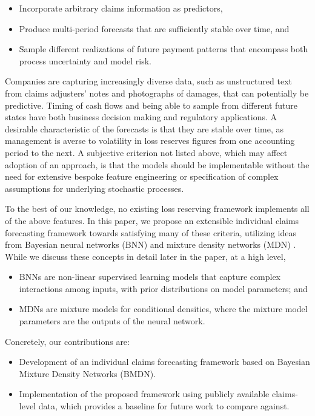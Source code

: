 \documentclass{article}
\begin{document}
\begin{itemize}
	\item Incorporate arbitrary claims information as predictors,
	\item Produce multi-period forecasts that are sufficiently stable over time, 
	and
	\item Sample different realizations of future payment patterns that encompass 
	both process uncertainty and model risk.
\end{itemize}
Companies are capturing increasingly diverse data, such as unstructured text 
from claims adjusters' notes and photographs of damages, that can potentially 
be predictive. Timing of cash flows and being able to sample from different 
future states have both business decision making and regulatory applications. A 
desirable characteristic of the forecasts is that they are stable over time, as 
management is averse to volatility in loss reserves figures from one accounting 
period to the next. A subjective criterion not listed above, which may affect
adoption of an approach, is that the models should be implementable without the
need for extensive bespoke feature engineering or specification of complex 
assumptions for underlying stochastic processes.

To the best of our knowledge, no existing loss reserving framework implements 
all of the above features. In this paper, we propose an extensible individual 
claims forecasting framework towards satisfying many of these criteria, utilizing
ideas from Bayesian neural networks (BNN) \cite{nealBayesianLearning2012} and 
mixture density networks (MDN) \cite{bishopMixtureDensity1994}. While we discuss
these concepts in detail later in the paper, at a high level,

\begin{itemize}
  \item BNNs are non-linear supervised learning models that capture complex 
  interactions among inputs, with prior distributions on model parameters; and
  \item MDNs are mixture models for conditional densities, where the mixture
  model parameters are the outputs of the neural network.
\end{itemize}
Concretely, our contributions are:

\begin{itemize}
	\item Development of an individual claims forecasting framework based on 
	Bayesian Mixture Density Networks (BMDN).
	\item Implementation of the proposed framework using publicly available 
	claims-level data, which provides a baseline for future work to compare 
	against.
\end{itemize}
\end{document}

